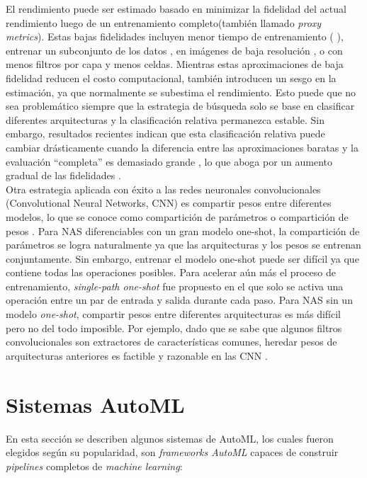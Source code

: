 El rendimiento puede ser estimado basado en minimizar la fidelidad del actual rendimiento luego de un entrenamiento completo(también llamado \textit{proxy metrics}). Estas bajas fidelidades incluyen menor tiempo de entrenamiento (\parencite{56} \parencite{57}), entrenar un subconjunto de los datos \parencite{58}, en imágenes de baja resolución \parencite{59}, o con menos filtros por capa y menos celdas. Mientras estas aproximaciones de baja fidelidad reducen el costo computacional, también introducen un sesgo en la estimación, ya que normalmente se subestima el rendimiento. Esto puede que no sea problemático siempre que la estrategia de búsqueda solo se base en clasificar diferentes arquitecturas y la clasificación relativa permanezca estable. Sin embargo, resultados recientes indican que esta clasificación relativa puede cambiar drásticamente cuando la diferencia entre las aproximaciones baratas y la evaluación “completa” es demasiado grande \parencite{57}, lo que aboga por un aumento gradual de las fidelidades \parencite{60} \parencite{61}.\\

Otra estrategia aplicada con éxito a las redes neuronales convolucionales (Convolutional Neural Networks, CNN) es compartir pesos entre diferentes modelos, lo que se conoce como compartición de parámetros o compartición de pesos \parencite{62}. Para NAS diferenciables con un gran modelo one-shot, la compartición de parámetros se logra naturalmente ya que las arquitecturas y los pesos se entrenan conjuntamente. Sin embargo, entrenar el modelo one-shot puede ser difícil ya que contiene todas las operaciones posibles. Para acelerar aún más el proceso de entrenamiento, \textit{single-path one-shot} fue propuesto \parencite{63} en el que solo se activa una operación entre un par de entrada y salida durante cada paso. Para NAS sin un modelo \textit{one-shot}, compartir pesos entre diferentes arquitecturas es más difícil pero no del todo imposible. Por ejemplo, dado que se sabe que algunos filtros convolucionales son extractores de características comunes, heredar pesos de arquitecturas anteriores es factible y razonable en las CNN \parencite{64}. 

\section{Sistemas AutoML}
En esta sección se describen algunos sistemas de AutoML, los cuales fueron elegidos según su popularidad, son \textit{frameworks AutoML} capaces de construir \textit{pipelines} completos de \textit{machine learning}:

